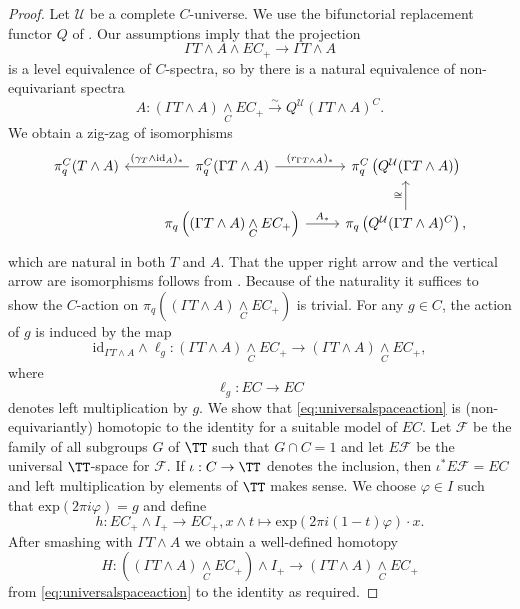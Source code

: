 \begin{proof}
Let $\mathcal{U}$ be a complete $C$-universe.
We use the bifunctorial
replacement functor $Q$ of \cite[Theorem~1.1, \pno~3]{rvadams}. Our assumptions 
imply that the projection 
\[ \Gamma T\wedge A\wedge EC_+\to  \Gamma T\wedge A\]
 is a level equivalence of $C$-spectra, so by \cite[Main Theorem~1.7, \pno~3]{rvadams} 
there is a natural equivalence of non-equivariant spectra
\[A:\left(\Gamma T\wedge A\right)\underset{C}{\wedge} EC_+\xrightarrow{\sim} Q^{\mathcal{U}}(\Gamma T\wedge A)^C.\]
We obtain a zig-zag of isomorphisms
\[
\begin{tikzcd}
\pi_q^C( T\wedge A)
&\pi_q^C( \Gamma T\wedge A)\arrow{l}[swap]{(\gamma_{ T}\wedge\mathrm{id}_A)_\ast}
\arrow{r}{(r_{ \Gamma T\wedge A})_\ast}
&\pi_q^C\left(  Q^{\mathcal{U}}( \Gamma T\wedge A) \right)
\\
&\pi_q\left(  \left( \Gamma T\wedge A\right)\underset{C}{\wedge} EC_+\right)
\arrow{r}{A_\ast}
&\pi_q\left(   Q^{\mathcal{U}}(\Gamma T\wedge A)^C \right)\arrow{u}{\cong},
\end{tikzcd}
\]
which are natural in both $T$ and $A$.
That the
upper right arrow and the vertical arrow
are isomorphisms follows from \cite[Theorem~1.2, \pno~3]{rvadams}.
Because of the naturality it suffices to show the $C$-action on 
$\pi_q\left(  \left( \Gamma T\wedge A\right)\underset{C}{\wedge} EC_+\right)$
is trivial. For any $g\in C$, the action of $g$ is induced by the map
\begin{equation}\label{eq:universalspaceaction}
\mathrm{id}_{\Gamma T\wedge A}\wedge \ell_g: 
\left( \Gamma T\wedge A\right)\underset{C}{\wedge} EC_+ 
\to  \left( \Gamma T\wedge A\right)\underset{C}{\wedge} EC_+,
\end{equation}
where
\[\ell_g:EC\to EC\]
denotes left multiplication by $g$. 
We show that \eqref{eq:universalspaceaction} is (non-equivariantly) homotopic to the identity
for a suitable model of $EC$. Let $\mathcal{F}$ be the family
of all subgroups $G$ of $\TT$ such that $G\cap C = 1$
and let $E\mathcal{F}$ be the universal $\TT$-space
for $\mathcal{F}$. If $\iota:C\to \TT$ denotes the inclusion,
then $\iota^\ast E\mathcal{F} = EC$ and left multiplication
by elements of $\TT$ makes sense.
We choose $\varphi\in I$ such that $\mathrm{exp}(2\pi i \varphi) = g$
and define
\[h:EC_+\wedge I_+\to EC_+, x\wedge t\mapsto \mathrm{exp}(2\pi i (1-t)\varphi)\cdot x.\]
After smashing with $\Gamma T\wedge A$ we obtain a 
well-defined homotopy
\[H: \left(\left( \Gamma T\wedge A\right)\underset{C}{\wedge} EC_+\right) \wedge I_+
\to  \left( \Gamma T\wedge A\right)\underset{C}{\wedge} EC_+\]
from \eqref{eq:universalspaceaction} to the identity as required.


\end{proof}
